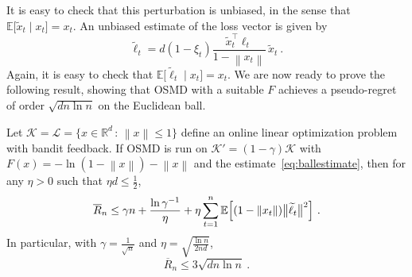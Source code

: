 \documentclass[11pt]{hackednow}
\newcommand{\E}{\mathbb{E}}
\newcommand{\R}{\mathbb{R}}
\newcommand{\cL}{\mathcal{L}}
\newcommand{\cK}{\mathcal{K}}
\newcommand{\oR}{\overline{R}}
\renewcommand{\tilde}{\widetilde}
\newcommand{\norm}[1]{\left\|{#1}\right\|}
\begin{document}
It is easy to check that this perturbation is unbiased, in the sense that
$\E\bigl[\tilde{x}_t \mid x_t\bigr] = x_t$.
An unbiased estimate of the loss vector is given by
\begin{equation} \label{eq:ballestimate}
\tilde{\ell}_t = d(1 - \xi_t) \frac{\tilde{x}_t^{\top}\ell_t}{1- \norm{x_t}}\,\tilde{x}_t~.
\end{equation}
Again, it is easy to check that
$\E\bigl[\tilde{\ell}_t \mid x_t\bigr] = x_t$.
We are now ready to prove the following result, showing that OSMD with a suitable $F$ achieves a pseudo-regret of order $\sqrt{dn\ln n}$ on the Euclidean ball.
\begin{theorem} \label{th:ball}
Let $\cK = \cL = \{x \in \R^d \,:\, \norm{x} \leq 1 \}$ define an online linear optimization problem with bandit feedback. If OSMD is run on $\cK' = (1-\gamma)\cK$ with $F(x) = - \ln(1 - \norm{x}) - \norm{x}$ and the estimate~\eqref{eq:ballestimate}, then for any $\eta > 0$ such that $\eta d \leq \frac12$,
\begin{equation} \label{eq:ballregret1}
\oR_n \leq \gamma n + \frac{\ln \gamma^{-1}}{\eta} + \eta \sum_{t=1}^n \E\Bigl[(1 - \norm{x_t})\big\|\tilde{\ell}_t\big\|^2\Bigr]~.
\end{equation}
In particular, with $\gamma = \frac{1}{\sqrt{n}}$ and $\eta= \sqrt{\frac{\ln n}{2 n d}}$,
\begin{equation} \label{eq:ballregret2}
\oR_n \leq  3 \sqrt{d n \ln n}~.
\end{equation}
\end{theorem}
%
\end{document}

